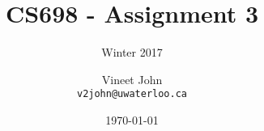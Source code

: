 \documentclass[parskip=full]{scrartcl}
\begin{document}
\title{CS698 - Assignment 3}
\subtitle{Winter 2017}
\author{
    Vineet John\\
    \texttt{v2john@uwaterloo.ca}
}
\date{\today}
\maketitle
\end{document}
